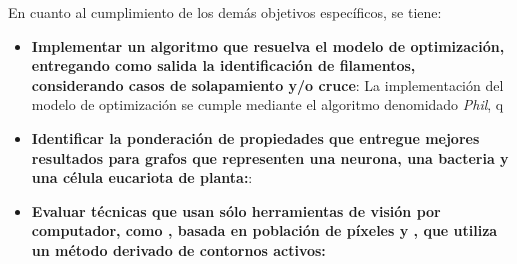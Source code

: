 En cuanto al cumplimiento de los dem\'as objetivos espec\'ificos, se tiene:
\begin{itemize}
    \item {\bf Implementar un algoritmo que resuelva el modelo de optimizaci\'on, entregando como salida la identificaci\'on de filamentos, considerando casos de solapamiento y/o cruce}: La implementaci\'on del modelo de optimizaci\'on se cumple mediante el algoritmo denomidado {\it Phil}, q
    
    \item {\bf Identificar la ponderaci\'on de propiedades que entregue mejores resultados para grafos que representen una neurona, una bacteria y una c\'elula eucariota de planta:}:
    
    
    \item {\bf Evaluar t\'ecnicas que usan s\'olo herramientas de visi\'on por computador, como \cite{boudaoud2014fibriltool}, basada en poblaci\'on de p\'ixeles y \cite{xu2015soax}, que utiliza un m\'etodo derivado de contornos activos:} 
\end{itemize}



